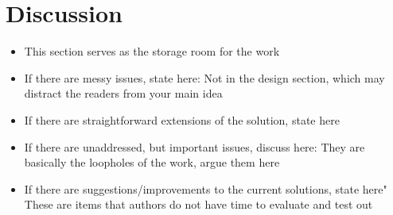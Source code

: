 \section{Discussion}
\begin{itemize}
\item
This section serves as the storage room for the work
\item
If there are messy issues, state here:
Not in the design section, which may distract the readers from your main idea
\item
If there are straightforward extensions of the solution, state here
\item
If there are unaddressed, but important issues, discuss here:
They are basically the loopholes of the work, argue them here
\item
If there are suggestions/improvements to the current solutions, state here"
These are items that authors do not have time to evaluate and test out
\end{itemize}